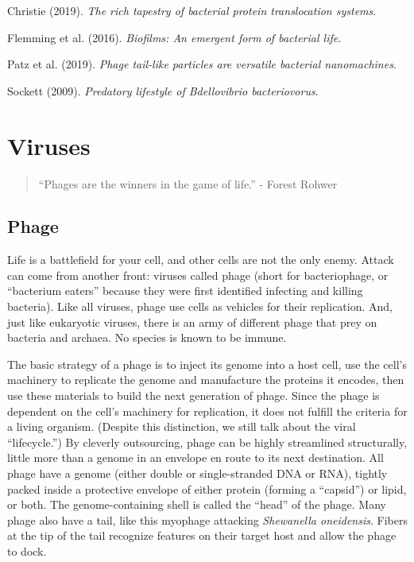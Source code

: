 \documentclass[]{tufte-book}
\begin{document}
Christie (2019). \emph{The rich tapestry of bacterial protein translocation systems}.\citep{christie2019}

Flemming et al. (2016). \emph{Biofilms: An emergent form of bacterial life}.\citep{flemming2016}

Patz et al. (2019). \emph{Phage tail-like particles are versatile bacterial nanomachines}.\citep{patz2019}

Sockett (2009). \emph{Predatory lifestyle of Bdellovibrio bacteriovorus}.\citep{sockett2009}

\hypertarget{viruses}{%
\chapter{Viruses}\label{viruses}}

\begin{quote}
``Phages are the winners in the game of life.''
- Forest Rohwer \citep{rohwer2014}
\end{quote}

\hypertarget{phage}{%
\section{Phage}\label{phage}}

Life is a battlefield for your cell, and other cells are not the only enemy. Attack can come from another front: viruses called phage (short for bacteriophage, or ``bacterium eaters'' because they were first identified infecting and killing bacteria). Like all viruses, phage use cells as vehicles for their replication. And, just like eukaryotic viruses, there is an army of different phage that prey on bacteria and archaea. No species is known to be immune.

The basic strategy of a phage is to inject its genome into a host cell, use the cell's machinery to replicate the genome and manufacture the proteins it encodes, then use these materials to build the next generation of phage. Since the phage is dependent on the cell's machinery for replication, it does not fulfill the criteria for a living organism. (Despite this distinction, we still talk about the viral ``lifecycle.'') By cleverly outsourcing, phage can be highly streamlined structurally, little more than a genome in an envelope en route to its next destination. All phage have a genome (either double or single-stranded DNA or RNA), tightly packed inside a protective envelope of either protein (forming a ``capsid'') or lipid, or both. The genome-containing shell is called the ``head'' of the phage. Many phage also have a tail, like this myophage attacking \emph{Shewanella oneidensis}. Fibers at the tip of the tail recognize features on their target host and allow the phage to dock.
\end{document}
